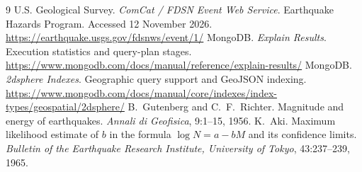 \documentclass[11pt,a4paper]{article}
\begin{document}
\begin{thebibliography}{9}
 U.S. Geological Survey. \emph{ComCat / FDSN Event Web Service}. Earthquake Hazards Program. Accessed 12 November 2026. \url{https://earthquake.usgs.gov/fdsnws/event/1/}
 MongoDB. \emph{Explain Results}. Execution statistics and query-plan stages. \url{https://www.mongodb.com/docs/manual/reference/explain-results/}
 MongoDB. \emph{2dsphere Indexes}. Geographic query support and GeoJSON indexing. \url{https://www.mongodb.com/docs/manual/core/indexes/index-types/geospatial/2dsphere/}
 B.~Gutenberg and C.~F.~Richter. Magnitude and energy of earthquakes. \emph{Annali di Geofisica}, 9:1--15, 1956.
 K.~Aki. Maximum likelihood estimate of $b$ in the formula $\log N = a - bM$ and its confidence limits. \emph{Bulletin of the Earthquake Research Institute, University of Tokyo}, 43:237--239, 1965.
\end{thebibliography}
\end{document}
